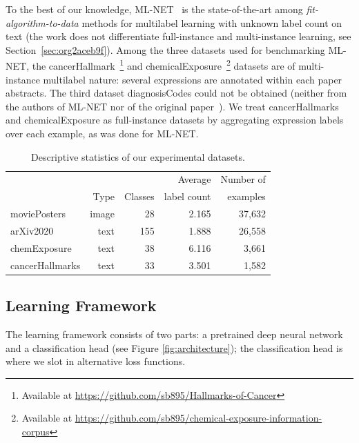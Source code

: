 To the best of our knowledge, ML-NET~\cite{multitaskLabel} is the state-of-the-art among \emph{fit-algorithm-to-data} methods for multilabel learning with unknown label count on text (the work does not differentiate full-instance and multi-instance learning, see Section~\ref{sec:org2aceb9f}). Among the three datasets used for benchmarking ML-NET, the cancerHallmark~\citep{cancerHallmarks}\footnote{Available at \url{https://github.com/sb895/Hallmarks-of-Cancer}} and chemicalExposure~\citep{chemExposure}\footnote{Available at \url{https://github.com/sb895/chemical-exposure-information-corpus}} datasets are of multi-instance multilabel nature: several expressions are annotated within each paper abstracts. The third dataset diagnosisCodes could not be obtained (neither from the authors of ML-NET nor of the original paper~\cite{diagnosisCode}). We treat cancerHallmarks and chemicalExposure as full-instance datasets by aggregating expression labels over each example, as was done for ML-NET.

\begin{table}
\caption{Descriptive statistics of our experimental datasets.}
\label{table:datasets}
\centering
\begin{tabular}{l rrrr}
\toprule
& & & Average & Number of \\
& Type & Classes & label count & examples \\
\midrule
moviePosters & image & 28 & 2.165 & 37,632\\
arXiv2020 & text & 155 & 1.888 & 26,558\\ 
chemExposure & text & 38 & 6.116 & 3,661\\
cancerHallmarks\hspace{-.7em}  & text & 33 & 3.501 & 1,582\\
\bottomrule
\end{tabular}
\end{table}

\subsection{Learning Framework}

The learning framework consists of two parts: a pretrained deep neural network and a classification head (see Figure \ref{fig:architecture}); the classification head is where we slot in alternative loss functions.

